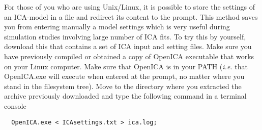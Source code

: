 For those of you who are using Unix/Linux, it is possible to store the settings of an ICA-model in a file and redirect its content to the prompt. This method saves you from entering manually a model settings which is very useful during simulation studies involving large number of ICA fits. To try this by yourself, download this  that contains a set of ICA input and setting files.  Make sure you have previously compiled or obtained a copy of OpenICA executable that works on your Linux computer. Make sure that OpenICA is in your PATH ({\it i.e.} that OpenICA.exe will execute when entered at the prompt, no matter where you stand in the filesystem tree). Move to the directory where you extracted the archive previously downloaded and type the following command in a terminal console 

\begin{verbatim}  OpenICA.exe < ICAsettings.txt > ica.log; \end{verbatim}

